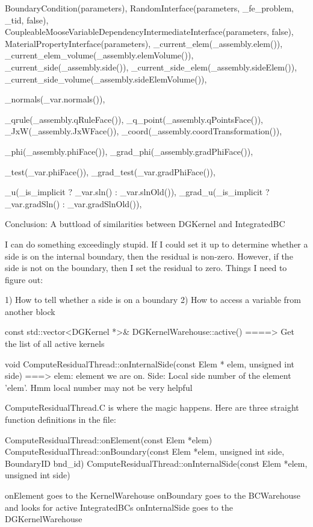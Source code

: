     BoundaryCondition(parameters),
    RandomInterface(parameters, _fe_problem, _tid, false),
    CoupleableMooseVariableDependencyIntermediateInterface(parameters, false),
    MaterialPropertyInterface(parameters),
    _current_elem(_assembly.elem()),
    _current_elem_volume(_assembly.elemVolume()),
    _current_side(_assembly.side()),
    _current_side_elem(_assembly.sideElem()),
    _current_side_volume(_assembly.sideElemVolume()),

    _normals(_var.normals()),

    _qrule(_assembly.qRuleFace()),
    _q_point(_assembly.qPointsFace()),
    _JxW(_assembly.JxWFace()),
    _coord(_assembly.coordTransformation()),

    _phi(_assembly.phiFace()),
    _grad_phi(_assembly.gradPhiFace()),

    _test(_var.phiFace()),
    _grad_test(_var.gradPhiFace()),

    _u(_is_implicit ? _var.sln() : _var.slnOld()),
    _grad_u(_is_implicit ? _var.gradSln() : _var.gradSlnOld()),

Conclusion: A buttload of similarities between DGKernel and IntegratedBC

I can do something exceedingly stupid. If I could set it up to determine whether a side is on the internal boundary, then the residual is non-zero. However, if the side is not on the boundary, then I set the residual to zero. Things I need to figure out:

1) How to tell whether a side is on a boundary
2) How to access a variable from another block

const std::vector<DGKernel *>& DGKernelWarehouse::active() ====> Get the list of all active kernels

void ComputeResidualThread::onInternalSide(const Elem * elem, unsigned int side) ===> elem: element we are on. Side: Local side number of the element 'elem'. Hmm local number may not be very helpful

ComputeResidualThread.C is where the magic happens. Here are three straight function definitions in the file:

ComputeResidualThread::onElement(const Elem *elem)
ComputeResidualThread::onBoundary(const Elem *elem, unsigned int side, BoundaryID bnd_id)
ComputeResidualThread::onInternalSide(const Elem *elem, unsigned int side)

onElement goes to the KernelWarehouse
onBoundary goes to the BCWarehouse and looks for active IntegratedBCs
onInternalSide goes to the DGKernelWarehouse

